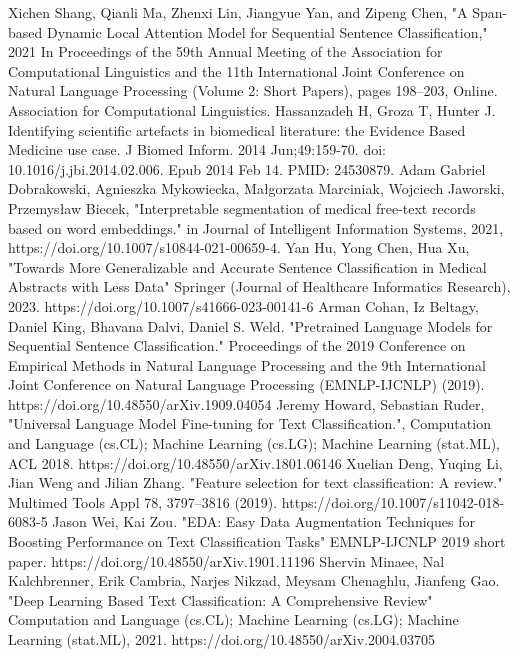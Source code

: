\documentclass[conference]{IEEEtran}
\begin{document}
\begin{thebibliography}{00}
 Xichen Shang, Qianli Ma, Zhenxi Lin, Jiangyue Yan, and Zipeng Chen, "A Span-based Dynamic Local Attention Model for Sequential Sentence Classification," 2021 In Proceedings of the 59th Annual Meeting of the Association for Computational Linguistics and the 11th International Joint Conference on Natural Language Processing (Volume 2: Short Papers), pages 198–203, Online. Association for Computational Linguistics.
 Hassanzadeh H, Groza T, Hunter J. Identifying scientific artefacts in biomedical literature: the Evidence Based Medicine use case. J Biomed Inform. 2014 Jun;49:159-70. doi: 10.1016/j.jbi.2014.02.006. Epub 2014 Feb 14. PMID: 24530879.
 Adam Gabriel Dobrakowski, Agnieszka Mykowiecka, Małgorzata Marciniak, Wojciech Jaworski, Przemysław Biecek, "Interpretable segmentation of medical free-text records based on word embeddings." in Journal of Intelligent Information Systems, 2021, 
https://doi.org/10.1007/s10844-021-00659-4.
 Yan Hu, Yong Chen, Hua Xu, "Towards More Generalizable and Accurate Sentence Classification in Medical Abstracts with Less Data" Springer (Journal of Healthcare Informatics Research), 2023. 
https://doi.org/10.1007/s41666-023-00141-6
 Arman Cohan, Iz Beltagy, Daniel King, Bhavana Dalvi, Daniel S. Weld. "Pretrained Language Models for Sequential Sentence Classification." Proceedings of the 2019 Conference on Empirical Methods in Natural Language Processing and the 9th International Joint Conference on Natural Language Processing (EMNLP-IJCNLP) (2019). https://doi.org/10.48550/arXiv.1909.04054
 Jeremy Howard, Sebastian Ruder, "Universal Language Model Fine-tuning for Text Classification.", Computation and Language (cs.CL); Machine Learning (cs.LG); Machine Learning (stat.ML), ACL 2018.
https://doi.org/10.48550/arXiv.1801.06146
 Xuelian Deng, Yuqing Li, Jian Weng and Jilian Zhang. "Feature selection for text classification: A review." Multimed Tools Appl 78, 3797–3816 (2019).
https://doi.org/10.1007/s11042-018-6083-5
 Jason Wei, Kai Zou. "EDA: Easy Data Augmentation Techniques for Boosting Performance on Text Classification Tasks" EMNLP-IJCNLP 2019 short paper. https://doi.org/10.48550/arXiv.1901.11196
 Shervin Minaee, Nal Kalchbrenner, Erik Cambria, Narjes Nikzad, Meysam Chenaghlu, Jianfeng Gao. "Deep Learning Based Text Classification: A Comprehensive Review" Computation and Language (cs.CL); Machine Learning (cs.LG); Machine Learning (stat.ML), 2021. 
https://doi.org/10.48550/arXiv.2004.03705
\end{thebibliography}
\vspace{12pt}
\end{document}

